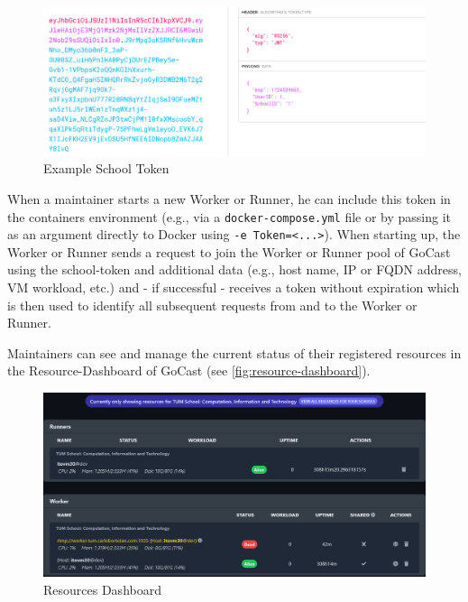 \begin{figure}[htpb]
    \centering
    \includegraphics[width=390pt]{images/SchoolToken.png}
    \caption[Example School Token]{Example School Token}\label{fig:school-token}
\end{figure}

When a maintainer starts a new Worker or Runner, he can include this token in the containers environment (e.g., via a \texttt{docker-compose.yml} file or by passing it as an argument directly to Docker using \texttt{-e Token=<...>}). When starting up, the Worker or Runner sends a request to join the Worker or Runner pool of GoCast using the school-token and additional data (e.g., host name, IP or FQDN address, \ac{VM} workload, etc.) and - if successful - receives a token without expiration which is then used to identify all subsequent requests from and to the Worker or Runner.  

Maintainers can see and manage the current status of their registered resources in the Resource-Dashboard of GoCast (see \autoref{fig:resource-dashboard}).

\begin{figure}[htpb]
    \centering
    \includegraphics[width=390pt]{images/ResourceDashboard.png}
    \caption[Resources Dashboard]{Resources Dashboard}\label{fig:resource-dashboard}
\end{figure}

